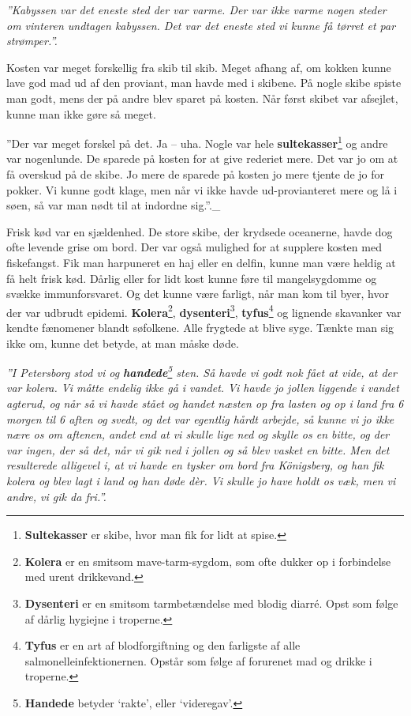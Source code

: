 \emph{''Kabyssen var det eneste sted der var varme. Der var ikke varme
nogen steder om vinteren undtagen kabyssen. Det var det eneste sted vi
kunne få tørret et par strømper.''.}

Kosten var meget forskellig fra skib til skib. Meget afhang af, om
kokken kunne lave god mad ud af den proviant, man havde med i skibene.
På nogle skibe spiste man godt, mens der på andre blev sparet på kosten.
Når først skibet var afsejlet, kunne man ikke gøre så meget.

''Der var meget forskel på det. Ja -- uha. Nogle var hele
\textbf{sultekasser}\footnote{\textbf{Sultekasser} er skibe, hvor man
  fik for lidt at spise.} og andre var nogenlunde. De sparede på kosten
for at give rederiet mere. Det var jo om at få overskud på de skibe. Jo
mere de sparede på kosten jo mere tjente de jo for pokker. Vi kunne godt
klage, men når vi ikke havde ud-provianteret mere og lå i søen, så var
man nødt til at indordne sig.''.\_

Frisk kød var en sjældenhed. De store skibe, der krydsede oceanerne,
havde dog ofte levende grise om bord. Der var også mulighed for at
supplere kosten med fiskefangst. Fik man harpuneret en haj eller en
delfin, kunne man være heldig at få helt frisk kød. Dårlig eller for
lidt kost kunne føre til mangelsygdomme og svække immunforsvaret. Og det
kunne være farligt, når man kom til byer, hvor der var udbrudt epidemi.
\textbf{Kolera}\footnote{\textbf{Kolera} er en smitsom mave-tarm-sygdom,
  som ofte dukker op i forbindelse med urent drikkevand.},
\textbf{dysenteri}\footnote{\textbf{Dysenteri} er en smitsom
  tarmbetændelse med blodig diarré. Opst som følge af dårlig hygiejne i
  troperne.}, \textbf{tyfus}\footnote{\textbf{Tyfus} er en art af
  blodforgiftning og den farligste af alle salmonelleinfektionernen.
  Opstår som følge af forurenet mad og drikke i troperne.} og lignende
skavanker var kendte fænomener blandt søfolkene. Alle frygtede at blive
syge. Tænkte man sig ikke om, kunne det betyde, at man måske døde.

\emph{''I Petersborg stod vi og \textbf{handede}\footnote{\textbf{Handede}
  betyder `rakte', eller `videregav'.} sten. Så havde vi godt nok fået
at vide, at der var kolera. Vi måtte endelig ikke gå i vandet. Vi havde
jo jollen liggende i vandet agterud, og når så vi havde stået og handet
næsten op fra lasten og op i land fra 6 morgen til 6 aften og svedt, og
det var egentlig hårdt arbejde, så kunne vi jo ikke nære os om aftenen,
andet end at vi skulle lige ned og skylle os en bitte, og der var ingen,
der så det, når vi gik ned i jollen og så blev vasket en bitte. Men det
resulterede alligevel i, at vi havde en tysker om bord fra Königsberg,
og han fik kolera og blev lagt i land og han døde dèr. Vi skulle jo have
holdt os væk, men vi andre, vi gik da fri.''.}

